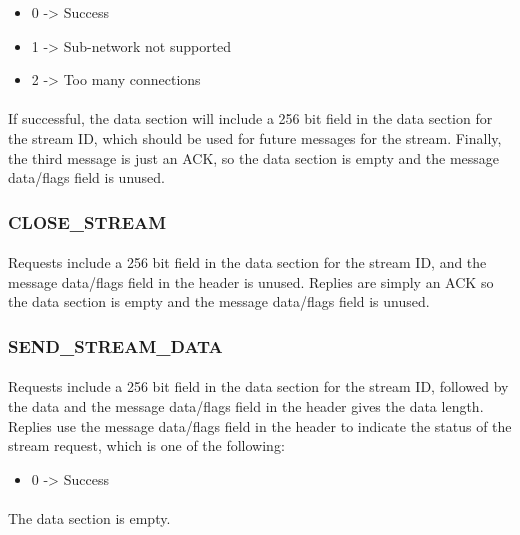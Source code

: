 \documentclass{article}
\begin{document}
\begin{itemize}
\item 0 -> Success
\item 1 -> Sub-network not supported
\item 2 -> Too many connections
\end{itemize}

\paragraph{}
If successful, the data section will include a 256 bit field in the data section for the stream ID, which should be used for future messages for the stream.
Finally, the third message is just an ACK, so the data section is empty and the message data/flags field is unused.

\subsubsection{CLOSE_STREAM}

\paragraph{}
Requests include a 256 bit field in the data section for the stream ID, and the message data/flags field in the header is unused.
Replies are simply an ACK so the data section is empty and the message data/flags field is unused.

\subsubsection{SEND_STREAM_DATA}

\paragraph{}
Requests include a 256 bit field in the data section for the stream ID, followed by the data and the message data/flags field in the header gives the data length.
Replies use the message data/flags field in the header to indicate the status of the stream request, which is one of the following:

\begin{itemize}
\item 0 -> Success
\end{itemize}

\paragraph{}
The data section is empty.
\end{document}
